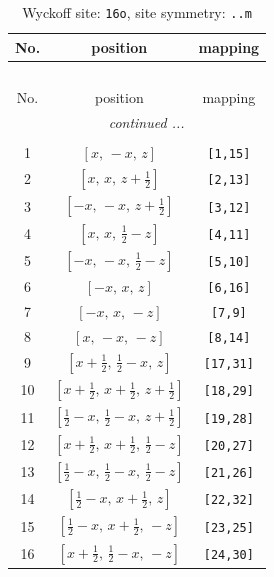 \documentclass[fleqn,8pt]{jsarticle}
\begin{document}
\renewcommand{\arraystretch}{1.2}
\begin{longtable}{ccc}
\caption{Wyckoff site: {\tt 16o}, site symmetry: {\tt ..m}}
 \\
 \hline \hline
No. & position & mapping \\ \hline \endfirsthead

\multicolumn{2}{l}{\tablename\ \thetable{}} \\
 \hline \hline
No. & position & mapping \\ \hline \endhead

 \hline \hline
\multicolumn{2}{r}{\footnotesize\it continued ...} \\ \endfoot

 \hline \hline
\multicolumn{2}{r}{} \\ \endlastfoot

1 & $\left[ x,\, - x,\, z \right]$ & {\tt [1,15]} \\ \hline
2 & $\left[ x,\, x,\, z + \frac{1}{2} \right]$ & {\tt [2,13]} \\ \hline
3 & $\left[ - x,\, - x,\, z + \frac{1}{2} \right]$ & {\tt [3,12]} \\ \hline
4 & $\left[ x,\, x,\, \frac{1}{2} - z \right]$ & {\tt [4,11]} \\ \hline
5 & $\left[ - x,\, - x,\, \frac{1}{2} - z \right]$ & {\tt [5,10]} \\ \hline
6 & $\left[ - x,\, x,\, z \right]$ & {\tt [6,16]} \\ \hline
7 & $\left[ - x,\, x,\, - z \right]$ & {\tt [7,9]} \\ \hline
8 & $\left[ x,\, - x,\, - z \right]$ & {\tt [8,14]} \\ \hline
9 & $\left[ x + \frac{1}{2},\, \frac{1}{2} - x,\, z \right]$ & {\tt [17,31]} \\ \hline
10 & $\left[ x + \frac{1}{2},\, x + \frac{1}{2},\, z + \frac{1}{2} \right]$ & {\tt [18,29]} \\ \hline
11 & $\left[ \frac{1}{2} - x,\, \frac{1}{2} - x,\, z + \frac{1}{2} \right]$ & {\tt [19,28]} \\ \hline
12 & $\left[ x + \frac{1}{2},\, x + \frac{1}{2},\, \frac{1}{2} - z \right]$ & {\tt [20,27]} \\ \hline
13 & $\left[ \frac{1}{2} - x,\, \frac{1}{2} - x,\, \frac{1}{2} - z \right]$ & {\tt [21,26]} \\ \hline
14 & $\left[ \frac{1}{2} - x,\, x + \frac{1}{2},\, z \right]$ & {\tt [22,32]} \\ \hline
15 & $\left[ \frac{1}{2} - x,\, x + \frac{1}{2},\, - z \right]$ & {\tt [23,25]} \\ \hline
16 & $\left[ x + \frac{1}{2},\, \frac{1}{2} - x,\, - z \right]$ & {\tt [24,30]} \\
\end{longtable}
\end{document}

